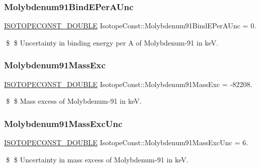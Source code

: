 \subsubsection{\texorpdfstring{Molybdenum91\+Bind\+E\+Per\+A\+Unc}{Molybdenum91BindEPerAUnc}}
{\footnotesize\ttfamily \mbox{\hyperlink{group___isotope_const-_macros_ga8f45a7272ce02c0b4c65c44636ed719a}{I\+S\+O\+T\+O\+P\+E\+C\+O\+N\+S\+T\+\_\+\+D\+O\+U\+B\+LE}} Isotope\+Const\+::\+Molybdenum91\+Bind\+E\+Per\+A\+Unc = 0.}

\$ \$ Uncertainty in binding energy per A of Molybdenum-\/91 in keV. \mbox{\label{group___isotope_const-_molybdenum-_mo91_gad6be9e67b1df414d0fb1bd4842fbe063}} 
\subsubsection{\texorpdfstring{Molybdenum91\+Mass\+Exc}{Molybdenum91MassExc}}
{\footnotesize\ttfamily \mbox{\hyperlink{group___isotope_const-_macros_ga8f45a7272ce02c0b4c65c44636ed719a}{I\+S\+O\+T\+O\+P\+E\+C\+O\+N\+S\+T\+\_\+\+D\+O\+U\+B\+LE}} Isotope\+Const\+::\+Molybdenum91\+Mass\+Exc = -\/82208.}

\$ \$ Mass excess of Molybdenum-\/91 in keV. \mbox{\label{group___isotope_const-_molybdenum-_mo91_ga46001b10d8dbfb5dc527d756562904a1}} 
\subsubsection{\texorpdfstring{Molybdenum91\+Mass\+Exc\+Unc}{Molybdenum91MassExcUnc}}
{\footnotesize\ttfamily \mbox{\hyperlink{group___isotope_const-_macros_ga8f45a7272ce02c0b4c65c44636ed719a}{I\+S\+O\+T\+O\+P\+E\+C\+O\+N\+S\+T\+\_\+\+D\+O\+U\+B\+LE}} Isotope\+Const\+::\+Molybdenum91\+Mass\+Exc\+Unc = 6.}

\$ \$ Uncertainty in mass excess of Molybdenum-\/91 in keV. \mbox{\label{group___isotope_const-_molybdenum-_mo91_gad8dcc15a50a3d2041deb86aaa282c494}} 
